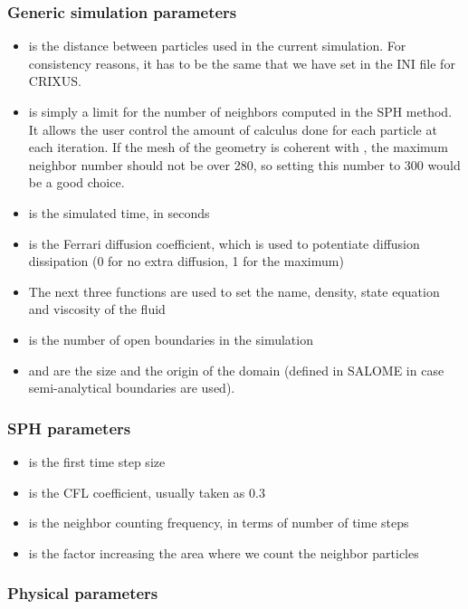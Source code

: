 \subsubsection{Generic simulation parameters}
\begin{itemize}
\item {} is the distance between particles used in the current simulation. 
For consistency reasons, it has to be the same that we have set in the INI file for CRIXUS.
\item {} is simply a limit for the number of neighbors computed 
in the SPH method. It allows the user control the amount of calculus 
done for each particle at each iteration. If the mesh of the geometry 
is coherent with , the maximum neighbor number should not be over 280, 
so setting this number to 300 would be a good choice.
\item {} is the simulated time, in seconds
\item {} is the Ferrari diffusion coefficient, which is used 
to potentiate diffusion dissipation (0 for no extra diffusion, 1 for the maximum)
\item The next three functions are used to set the name, density, state equation and viscosity of the fluid
\item {} is the number of open boundaries in the simulation
\item {} and  are the size and the origin of the domain 
(defined in SALOME in case semi-analytical boundaries are used).
\end{itemize}

\subsubsection{SPH parameters}

\begin{itemize}
\item {} is the first time step size
\item {} is the CFL coefficient, usually taken as 0.3
\item {} is the neighbor counting frequency, in terms of number of time steps
\item {} is the factor increasing the area where we count the neighbor particles
\end{itemize}

\subsubsection{Physical parameters}
 
